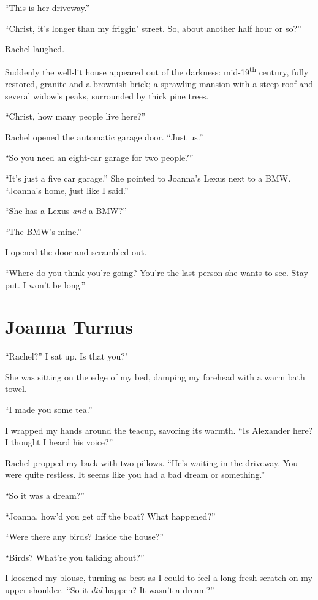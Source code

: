 ``This is her driveway.''

``Christ, it's longer than my friggin' street. So, about another half
hour or so?''

Rachel laughed.

Suddenly the well-lit house appeared out of the darkness:
mid-19\textsuperscript{th} century, fully restored, granite and a
brownish brick; a sprawling mansion with a steep roof and several
widow's peaks, surrounded by thick pine trees.

``Christ, how many people live here?''

Rachel opened the automatic garage door. ``Just us.''

``So you need an eight-car garage for two people?''

``It's just a five car garage.'' She pointed to Joanna's Lexus next to a
BMW. ``Joanna's home, just like I said.''

``She has a Lexus \emph{and} a BMW?''

``The BMW's mine.''

I opened the door and scrambled out.

``Where do you think you're going? You're the last person she wants to
see. Stay put. I won't be long.''

\chapter{Joanna Turnus}

\titlemark

``Rachel?'' I sat up. Is that you?"

She was sitting on the edge of my bed, damping my forehead with a warm
bath towel.

``I made you some tea.''

I wrapped my hands around the teacup, savoring its warmth. ``Is
Alexander here? I thought I heard his voice?''

Rachel propped my back with two pillows. ``He's waiting in the driveway.
You were quite restless. It seems like you had a bad dream or
something.''

``So it was a dream?''

``Joanna, how'd you get off the boat? What happened?''

``Were there any birds? Inside the house?''

``Birds? What're you talking about?''

I loosened my blouse, turning as best as I could to feel a long fresh
scratch on my upper shoulder. ``So it \emph{did} happen? It wasn't a
dream?''

